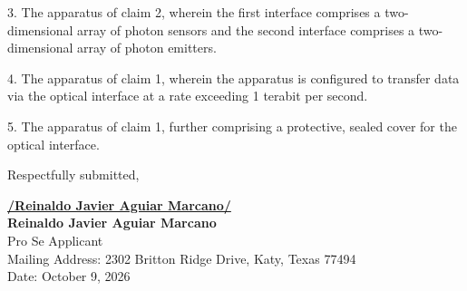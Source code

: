 \documentclass[11pt,letterpaper]{article}
\begin{document}
3. The apparatus of claim 2, wherein the first interface comprises a two-dimensional array of photon sensors and the second interface comprises a two-dimensional array of photon emitters.

4. The apparatus of claim 1, wherein the apparatus is configured to transfer data via the optical interface at a rate exceeding 1 terabit per second.

5. The apparatus of claim 1, further comprising a protective, sealed cover for the optical interface.

\vspace{0.8cm}
\begin{singlespace}
\noindent Respectfully submitted, \par\vspace{1.0cm}
\underline{\textbf{/Reinaldo Javier Aguiar Marcano/}} \\
\textbf{Reinaldo Javier Aguiar Marcano} \\
Pro Se Applicant \\
Mailing Address: 2302 Britton Ridge Drive, Katy, Texas 77494 \\
Date: October 9, 2026
\end{singlespace}
\end{document}
